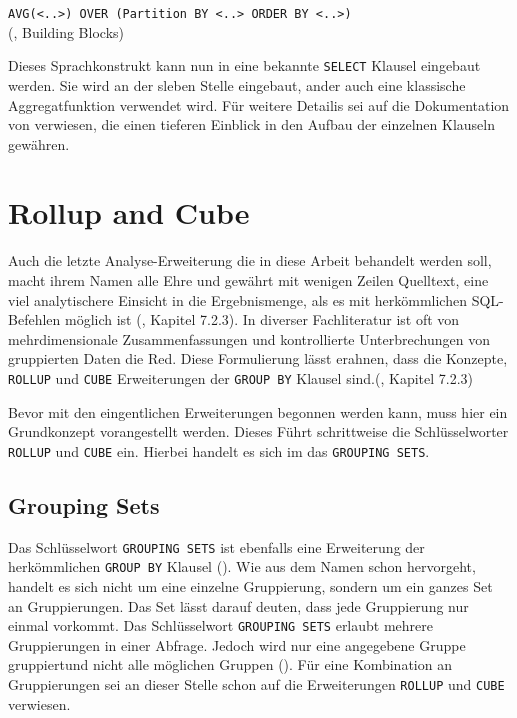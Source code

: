 \texttt{AVG(<..>) OVER (Partition BY <..> ORDER BY <..>)} \\ (\cite{Nuijten2023},
Building Blocks)

Dieses Sprachkonstrukt kann nun in eine bekannte \texttt{SELECT} Klausel eingebaut
werden. Sie wird an der sleben Stelle eingebaut, ander auch eine klassische Aggregatfunktion
verwendet wird. Für weitere Detailis sei auf die Dokumentation von \citet{oracle}
verwiesen, die einen tieferen Einblick in den Aufbau der einzelnen Klauseln
gewähren.


\section{Rollup and Cube}
Auch die letzte Analyse-Erweiterung die in diese Arbeit behandelt werden soll,
macht ihrem Namen alle Ehre und gewährt mit wenigen Zeilen Quelltext, eine viel analytischere
Einsicht in die Ergebnismenge, als es mit herkömmlichen SQL-Befehlen möglich ist
(\cite{melton2002advanced}, Kapitel 7.2.3). In diverser Fachliteratur ist oft von
mehrdimensionale Zusammenfassungen und kontrollierte Unterbrechungen von gruppierten
Daten die Red. Diese Formulierung lässt erahnen, dass die Konzepte, \texttt{ROLLUP}
und \texttt{CUBE} Erweiterungen der \texttt{GROUP BY} Klausel sind.(\cite{melton2002advanced},
Kapitel 7.2.3)

Bevor mit den eingentlichen Erweiterungen begonnen werden kann, muss hier ein Grundkonzept
vorangestellt werden. Dieses Führt schrittweise die Schlüsselworter \texttt{ROLLUP}
und \texttt{CUBE} ein. Hierbei handelt es sich im das \texttt{GROUPING SETS}.

\subsection{Grouping Sets}
Das Schlüsselwort \texttt{GROUPING SETS} ist ebenfalls eine Erweiterung der herkömmlichen
\texttt{GROUP BY} Klausel (\cite{oracle16}). Wie aus dem Namen schon hervorgeht,
handelt es sich nicht um eine einzelne Gruppierung, sondern um ein ganzes Set an
Gruppierungen. Das Set lässt darauf deuten, dass jede Gruppierung nur einmal vorkommt.
Das Schlüsselwort \texttt{GROUPING SETS} erlaubt mehrere Gruppierungen in einer Abfrage.
Jedoch wird nur eine angegebene Gruppe gruppiertund nicht alle möglichen Gruppen
(\cite{oracle16}). Für eine Kombination an Gruppierungen sei an dieser Stelle schon
auf die Erweiterungen \texttt{ROLLUP} und \texttt{CUBE} verwiesen.

